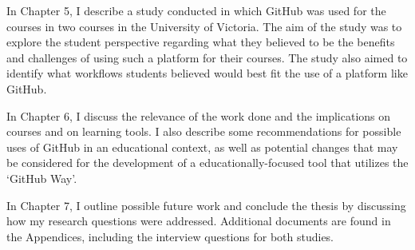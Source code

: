 In Chapter 5, I describe a study conducted in which GitHub was used for the courses in two courses in the University of Victoria. The aim of the study was to explore the student perspective regarding what they believed to be the benefits and challenges of using such a platform for their courses. The study also aimed to identify what workflows students believed would best fit the use of a platform like GitHub.

In Chapter 6, I discuss the relevance of the work done and the implications on courses and on learning tools. I also describe some recommendations for possible uses of GitHub in an educational context, as well as potential changes that may be considered for the development of a educationally-focused tool that utilizes the `GitHub Way'.

In Chapter 7, I outline possible future work and conclude the thesis by discussing how my research questions were addressed. Additional documents are found in the Appendices, including the interview questions for both studies.



